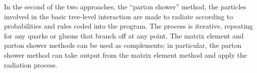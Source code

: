In the second of the two approaches, 
the ``parton shower'' method, 
the particles involved in the 
basic tree-level interaction 
are made to radiate 
according to 
probabilities and rules coded into the program.  
The process is iterative, 
repeating for any quarks or gluons that 
branch off at any point.  
The matrix element and parton shower methods 
can be used as complements; 
in particular, the parton shower method 
can take output from the matrix element method 
and apply the radiation process.  



